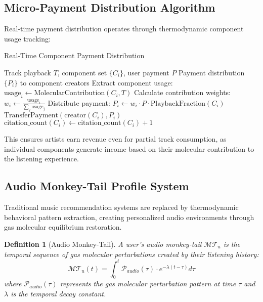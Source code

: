 \documentclass[12pt,a4paper]{article}
\newtheorem{definition}[theorem]{Definition}
\begin{document}
\subsection{Micro-Payment Distribution Algorithm}

Real-time payment distribution operates through thermodynamic component usage tracking:

\begin{algorithm}
\caption{Real-Time Component Payment Distribution}
\begin{algorithmic}[1]
\REQUIRE Track playback $T$, component set $\{C_i\}$, user payment $P$
\ENSURE Payment distribution $\{P_i\}$ to component creators
\STATE Extract component usage: $\text{usage}_i \leftarrow \text{MolecularContribution}(C_i, T)$
\STATE Calculate contribution weights: $w_i \leftarrow \frac{\text{usage}_i}{\sum_j \text{usage}_j}$
\STATE Distribute payment: $P_i \leftarrow w_i \cdot P \cdot \text{PlaybackFraction}(C_i)$
    \STATE $\text{TransferPayment}(\text{creator}(C_i), P_i)$
    \STATE $\text{citation\_count}(C_i) \leftarrow \text{citation\_count}(C_i) + 1$
\ENDFOR
\end{algorithmic}
\end{algorithm}

This ensures artists earn revenue even for partial track consumption, as individual components generate income based on their molecular contribution to the listening experience.

\subsection{Audio Monkey-Tail Profile System}

Traditional music recommendation systems are replaced by thermodynamic behavioral pattern extraction, creating personalized audio environments through gas molecular equilibrium restoration.

\begin{definition}[Audio Monkey-Tail]
A user's audio monkey-tail $\mathcal{MT}_u$ is the temporal sequence of gas molecular perturbations created by their listening history:
\begin{equation}
\mathcal{MT}_u(t) = \int_0^t \mathcal{P}_{audio}(\tau) \cdot e^{-\lambda(t-\tau)} d\tau
\end{equation}
where $\mathcal{P}_{audio}(\tau)$ represents the gas molecular perturbation pattern at time $\tau$ and $\lambda$ is the temporal decay constant.
\end{definition}
\end{document}
